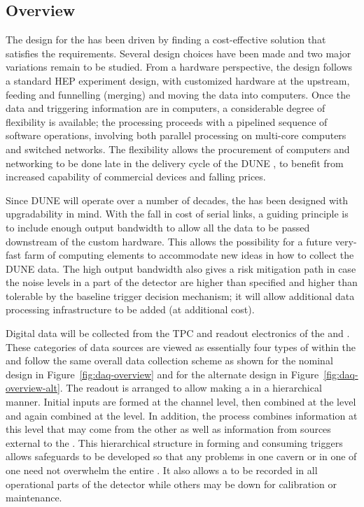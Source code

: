 \subsection{Overview}
\label{sec:fd-daq-overview}

The design for the  has been driven by finding a cost-effective solution that satisfies the requirements. Several design
choices have %
been made and two major variations remain to
be studied. 
From a hardware perspective, the  design follows a standard HEP
experiment design, with customized hardware at the upstream, feeding
and funnelling (merging) and moving the data into computers. 
Once the data and triggering information are in computers, a
considerable degree of flexibility is available;  the processing
proceeds with a pipelined sequence of software operations, involving
both parallel processing on multi-core computers and switched
networks. The flexibility allows the procurement of computers and
networking to be done late in the delivery cycle of the DUNE
, to benefit from increased capability of commercial devices
and falling prices.

Since DUNE will operate over a number of decades, the  has been
designed with upgradability in mind. 
With the fall in cost of serial links, a guiding principle is to
include enough output bandwidth to allow all the data to be passed
downstream of the custom hardware.
This allows the possibility for a future very-fast farm of computing
elements to accommodate new ideas in how to collect the DUNE data. 
The high output bandwidth also gives a risk mitigation path in case
the noise levels in a part of the detector are higher than specified
and higher than tolerable by the baseline trigger decision mechanism;
it will allow additional data processing infrastructure to be added
(at additional cost).

Digital data will be collected from the TPC and 
readout electronics of the \single and \dual
{}. 
These categories of data sources are viewed as essentially four types
of  within the  and follow the same overall
data collection scheme as shown for the nominal design in
Figure~\ref{fig:daq-overview} and for the alternate design in
Figure~\ref{fig:daq-overview-alt}. 
The readout is arranged to allow making a  
in a hierarchical manner. 
Initial inputs are formed at the channel level, then combined at the
 level and again %
combined at the
 level.
In addition, the  process combines %
information at this level that may come from the other  as well as
information from sources external to the . 
This hierarchical structure in forming and consuming triggers 
allows safeguards to be developed so that any problems in one cavern or
in one  of one  need not overwhelm the
entire .
It also allows a  to be recorded in all
operational parts of the detector while others may be down for
calibration or maintenance.

